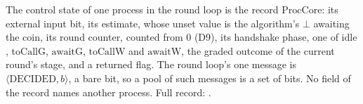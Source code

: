 \begin{definition}
  \label{def:aba-core-vocab}
  \leanok
  The control state of one process in the round loop is the record $\mathrm{ProcCore}$: its external input bit, its estimate, whose unset value is the algorithm's $\bot$ awaiting the coin, its round counter, counted from $0$ (D9), its handshake phase, one of $\mathrm{idle}$, $\mathrm{toCallG}$, $\mathrm{awaitG}$, $\mathrm{toCallW}$ and $\mathrm{awaitW}$, the graded outcome of the current round's stage, and a returned flag.
  The round loop's one message is $\langle\mathrm{DECIDED},b\rangle$, a bare bit, so a pool of such messages is a set of bits.
  No field of the record names another process.
  Full record: .
\end{definition}
